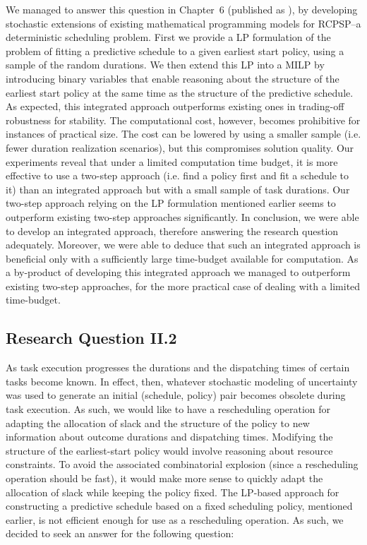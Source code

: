 	We managed to answer this question in Chapter~6 (published as \cite{mountakis2015}),
	by developing stochastic extensions of existing mathematical programming models for RCPSP--a deterministic scheduling problem.
	First we provide a LP formulation of the problem of fitting a predictive schedule to a given earliest start policy, 
	using a sample of the random durations.
	We then extend this LP into a MILP by introducing binary variables that enable reasoning 
	about the structure of the earliest start policy at the same time as the structure of the predictive schedule.
	As expected, this integrated approach outperforms existing ones in trading-off robustness for stability.
	The computational cost, however, becomes prohibitive for instances of practical size.
	The cost can be lowered by using a smaller sample (i.e. fewer duration realization scenarios), but this compromises solution quality.
	Our experiments reveal that under a limited computation time budget,
	it is more effective to use a two-step approach (i.e. find a policy first and fit a schedule to it) than
	an integrated approach but with a small sample of task durations.
	Our two-step approach relying on the LP formulation mentioned earlier seems to outperform existing two-step approaches significantly.
	In conclusion, we were able to develop an integrated approach, therefore answering the research question adequately.
	Moreover, we were able to deduce that such an integrated approach is beneficial only with a sufficiently large time-budget available for computation.
	As a by-product of developing this integrated approach we managed to outperform existing two-step approaches, 
	for the more practical case of dealing with a limited time-budget.

\subsection{Research Question II.2}

	As task execution progresses the durations and the dispatching times of certain tasks become known.
	In effect, then, whatever stochastic modeling of uncertainty was used to generate an initial (schedule, policy) 
	pair becomes obsolete during task execution.
	As such, we would like to have a rescheduling operation for adapting the allocation of slack
	and the structure of the policy to new information about outcome durations and dispatching times.
	Modifying the structure of the earliest-start policy would involve reasoning about resource constraints.
	To avoid the associated combinatorial explosion (since a rescheduling operation should be fast),
	it would make more sense to quickly adapt the allocation of slack while keeping the policy fixed.
	The LP-based approach for constructing a predictive schedule based on a fixed scheduling policy,
	mentioned earlier, is not efficient enough for use as a rescheduling operation.	
	As such, we decided to seek an answer for the following question:

